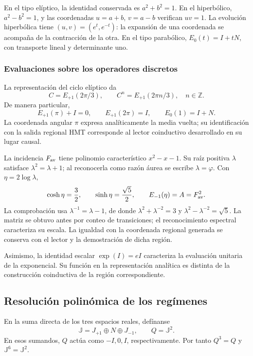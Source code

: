 En el tipo elíptico, la identidad conservada es \(a^2+b^2=1\).
En el hiperbólico, \(a^2-b^2=1\), y las coordenadas \(u=a+b\),
\(v=a-b\) verifican \(uv=1\). La evolución hiperbólica tiene
\((u,v)=(e^t,e^{-t})\): la expansión de una coordenada se acompaña
de la contracción de la otra. En el tipo parabólico,
\(E_0(t)=I+tN\), con transporte lineal y determinante uno.

\subsubsection{Evaluaciones sobre los operadores discretos}

La representación del ciclo elíptico da
\[
 C=E_{+1}(2\pi/3),\qquad
 C^n=E_{+1}(2\pi n/3),\quad n\in\mathbb Z.
\]
De manera particular,
\[
 E_{+1}(\pi)+I=0,\qquad E_{+1}(2\pi)=I,
 \qquad E_0(1)=I+N.
\]
La coordenada angular \(\pi\) expresa analíticamente la media vuelta;
su identificación con la salida regional HMT corresponde al lector
coinductivo desarrollado en su lugar causal.

La incidencia \(F_{\rm av}\) tiene polinomio característico
\(x^2-x-1\). Su raíz positiva \(\lambda\) satisface
\(\lambda^2=\lambda+1\); al reconocerla como razón áurea se escribe
\(\lambda=\varphi\). Con \(\eta=2\log\lambda\),
\[
 \cosh\eta=\frac32,\qquad \sinh\eta=\frac{\sqrt5}{2},
 \qquad E_{-1}(\eta)=A=F_{\rm av}^2.
\]
La comprobación usa \(\lambda^{-1}=\lambda-1\), de donde
\(\lambda^2+\lambda^{-2}=3\) y
\(\lambda^2-\lambda^{-2}=\sqrt5\). La matriz se obtuvo antes por
conteo de transiciones; el reconocimiento espectral caracteriza su
escala. La igualdad con la coordenada regional generada se conserva
con el lector y la demostración de dicha región.

Asimismo, la identidad escalar \(\exp(I)=eI\) caracteriza la evaluación
unitaria de la exponencial. Su función en la representación analítica
es distinta de la construcción coinductiva de la región correspondiente.

\subsection{Resolución polinómica de los regímenes}
\label{eul:proyectores}

En la suma directa de los tres espacios reales, defínanse
\[
 \mathbb J=J_{+1}\oplus N\oplus J_{-1},\qquad Q=\mathbb J^2.
\]
En esos sumandos, \(Q\) actúa como \(-I,0,I\), respectivamente.
Por tanto \(Q^3=Q\) y \(\mathbb J^6=\mathbb J^2\).

